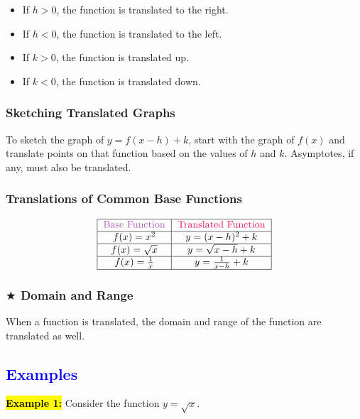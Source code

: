 \documentclass[12pt,a4paper]{article}
\begin{document}
\begin{itemize}
    \item If \( h > 0 \), the function is translated to the right.
    \item If \( h < 0 \), the function is translated to the left.
    \item If \( k > 0 \), the function is translated up.
    \item If \( k < 0 \), the function is translated down.
\end{itemize}

\subsubsection*{Sketching Translated Graphs}
To sketch the graph of \( y = f(x - h) + k \), start with the graph of \( f(x) \) and translate points on that function based on the values of \( h \) and \( k \). Asymptotes, if any, must also be translated.

\subsubsection*{Translations of Common Base Functions}
\vspace*{\fill}
\[
\begin{tabular}{|c|c|}
    \hline
    \textcolor{Orchid}{Base Function} & \textcolor{WildStrawberry}{Translated Function} \\
    \hline
    \( f(x) = x^2 \) & \( y = (x - h)^2 + k \) \\
    \hline
    \( f(x) = \sqrt{x} \) & \( y = \sqrt{x - h} + k \) \\
    \hline    
    \( f(x) = \frac{1}{x} \) & \( y = \frac{1}{x - h} + k \) \\
    \hline
\end{tabular}
\]
\vspace*{\fill}

\subsubsection*{$\bigstar$ Domain and Range}
When a function is translated, the domain and range of the function are translated as well.


\subsection*{\textcolor{blue}{Examples}}

\textbf{\hl{Example 1:}} Consider the function \(y = \sqrt{x}\).
\end{document}

